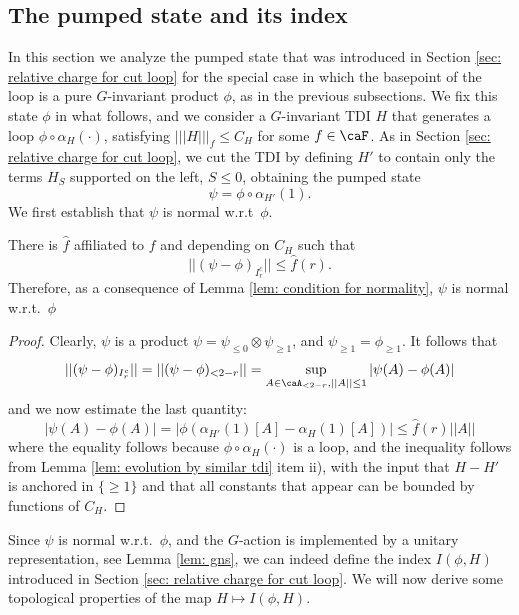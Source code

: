 \subsection{The pumped state and its index}\label{sec: states cut loop}

In this section we analyze the pumped state that was introduced in Section \ref{sec: relative charge for cut loop} for the special case in which the basepoint of the loop is a pure $G$-invariant product $\phi$, as in the previous subsections. 
We fix this state $\phi$ in what follows, and we consider a $G$-invariant TDI $H$ that generates a loop $\phi\circ\alpha_H(\cdot)$, satisfying  $|||H|||_f\leq C_H$ for some $f\in\caF$.  As in Section \ref{sec: relative charge for cut loop}, 
we cut the TDI by defining $H'$ to contain only the terms $H_S$ supported on the left, $S \leq 0$,  obtaining the pumped state
\begin{equation}\label{eq: pumped state}
	\psi= \phi\circ \alpha_{H'}(1).
\end{equation}
We first establish that $\psi$ is normal w.r.t\ $\phi$.
\begin{lemma}\label{lem: cut state}
	There is $\hat{f}$ affiliated to $f$ and depending on $C_H$ such that 
	\begin{equation}\label{eq: two-sided bound}
		|| (\psi-\phi)_{I_r^c} || \leq  \hat{f}(r).
	\end{equation}
	Therefore, as a consequence of Lemma \ref{lem: condition for normality}, $\psi$ is normal w.r.t.\ $\phi$
\end{lemma}
\begin{proof}
	Clearly, $\psi$ is a product $\psi=\psi_{\leq 0}\otimes \psi_{\geq 1}$, and $\psi_{\geq 1}=\phi_{\geq 1}$. It follows that 
	$$
	||(\psi-\phi)_{I_r^c} ||= || (\psi-\phi)_{<2-r} ||=\sup_{A \in\caA_{<2-r}, ||A|| \leq 1}  |\psi(A)-\phi(A)|
	$$
	and we now estimate the last quantity:
	\begin{equation}
		| \psi(A) - \phi(A)| =|\phi( \alpha_{H'}(1)[A] - \alpha_H(1)[A]) | \leq  \hat{f}(r) ||A||
		\label{eq: onesided bound}
	\end{equation}
	where the equality follows because  $\phi\circ\alpha_{H}(\cdot)$ is a loop,
	and the inequality follows from Lemma \ref{lem: evolution by similar tdi} item ii), with the input that $H-H'$ is anchored in $\{\geq 1\}$ and that all constants that appear can be bounded by functions of $C_H$.  
\end{proof}

Since $\psi$ is normal w.r.t.\ $\phi$, and the $G$-action is implemented by a unitary representation, see Lemma \ref{lem: gns},  we can indeed define the index $I(\phi,H)$ introduced in Section \ref{sec: relative charge for cut loop}.  We will now derive some topological properties of the map $H\mapsto I(\phi,H) $.






